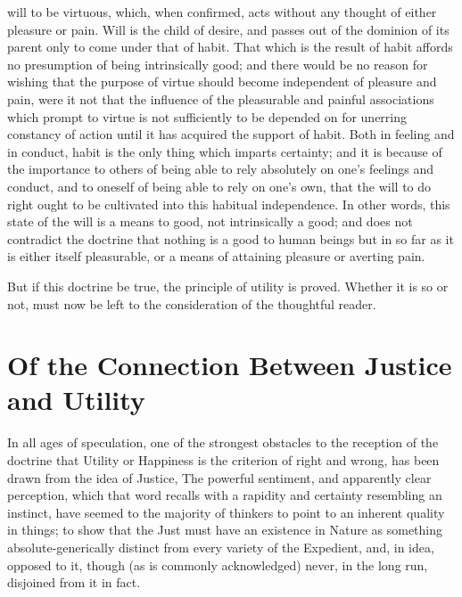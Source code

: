 \documentclass[12pt]{report}
\begin{document}
will to be virtuous, which, when confirmed, acts without any thought of either pleasure or pain. Will is the child of desire, and passes out of the dominion of its parent only to come under that of habit. That which is the result of habit affords no presumption of being intrinsically good; and there would be no reason for wishing that the purpose of virtue should become independent of pleasure and pain, were it not that the influence of the pleasurable and painful associations which prompt to virtue is not sufficiently to be depended on for unerring constancy of action until it has acquired the support of habit. Both in feeling and in conduct, habit is the only thing which imparts certainty; and it is because of the importance to others of being able to rely absolutely on one's feelings and conduct, and to oneself of being able to rely on one's own, that the will to do right ought to be cultivated into this habitual independence. In other words, this state of the will is a means to good, not intrinsically a good; and does not contradict the doctrine that nothing is a good to human beings but in so far as it is either itself pleasurable, or a means of attaining pleasure or averting pain.

But if this doctrine be true, the principle of utility is proved. Whether it is so or not, must now be left to the consideration of the thoughtful reader.
\chapter{Of the Connection Between Justice and Utility}
In all ages of speculation, one of the strongest obstacles to the reception of the doctrine that Utility or Happiness is the criterion of right and wrong, has been drawn from the idea of Justice, The powerful sentiment, and apparently clear perception, which that word recalls with a rapidity and certainty resembling an instinct, have seemed to the majority of thinkers to point to an inherent quality in things; to show that the Just must have an existence in Nature as something absolute-generically distinct from every variety of the Expedient, and, in idea, opposed to it, though (as is commonly acknowledged) never, in the long run, disjoined from it in fact.
\end{document}
